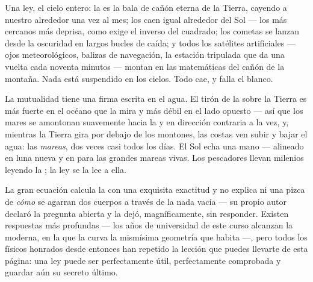 \begin{proposition}\label{prop:g9:gravitation:runs}
Una ley, el cielo entero: la  es la bala de cañón eterna de
la Tierra, cayendo a nuestro alrededor una vez al mes; los
 caen igual alrededor del Sol --- los más cercanos más
deprisa, como exige el inverso del cuadrado; los cometas se lanzan
desde la oscuridad en largos bucles de caída; y todos los satélites
artificiales --- ojos meteorológicos, balizas de navegación, la
estación tripulada que da una vuelta cada noventa minutos --- montan en
las matemáticas del cañón de la montaña. Nada está suspendido en los
cielos. Todo cae, y falla el blanco.
\end{proposition}

\begin{example}\label{ex:g9:gravitation:tides}
La mutualidad tiene una firma escrita en el agua. El tirón de la
 sobre la Tierra es más fuerte en el océano que la mira y más
débil en el lado opuesto --- así que los mares se amontonan suavemente
hacia la  y en dirección contraria a la vez, y, mientras la
Tierra gira por debajo de los montones, las costas ven subir y bajar el
agua: las \emph{mareas}, dos veces casi todos los días. El Sol echa una
mano --- alineado en luna nueva y en  para las grandes
mareas vivas. Los pescadores llevan milenios leyendo la
; la ley se la lee a ella.
\end{example}

\begin{remark}\label{rem:g9:gravitation:notsay}
La gran ecuación calcula la  con una exquisita exactitud y
no explica ni una pizca de \emph{cómo} se agarran dos cuerpos a través
de la nada vacía --- su propio autor declaró la pregunta abierta y la
dejó, magníficamente, sin responder. Existen respuestas más profundas
--- los años de universidad de este curso alcanzan la moderna, en la
que la  curva la mismísima geometría que habita ---, pero
todos los físicos honrados desde entonces han repetido la lección que
puedes llevarte de esta página: una ley puede ser perfectamente útil,
perfectamente comprobada y guardar aún su secreto último.
\end{remark}

